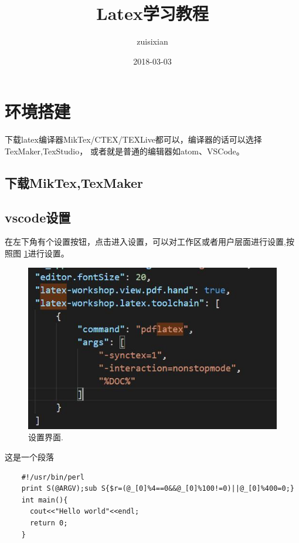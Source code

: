 \documentclass{article}
\title{Latex学习教程}
\date{2018-03-03}
\author{zuisixian}
\begin{document}
\maketitle
\doublespacing

\tableofcontents
\doublespacing

\newpage


  \section{环境搭建}
  下载latex编译器MikTex/CTEX/TEXLive都可以，编译器的话可以选择TexMaker,TexStudio，
  或者就是普通的编辑器如atom、VSCode。
    \subsection{下载MikTex,TexMaker}

    \subsection{vscode设置}
    在左下角有个设置按钮，点击进入设置，可以对工作区或者用户层面进行设置,按照图 \ref{fig:set1}进行设置。
    \begin{figure}
      \includegraphics[width=\linewidth]{image/vscode-setting.jpg}
      \caption{设置界面.}
      \label{fig:set1}
    \end{figure}

    这是一个段落
    \begin{lstlisting}
    #!/usr/bin/perl
    print S(@ARGV);sub S{$r=(@_[0]%4==0&&@_[0]%100!=0)||@_[0]%400=0;}
    int main(){
      cout<<"Hello world"<<endl;
      return 0;
    }
    \end{lstlisting}
\end{document}
